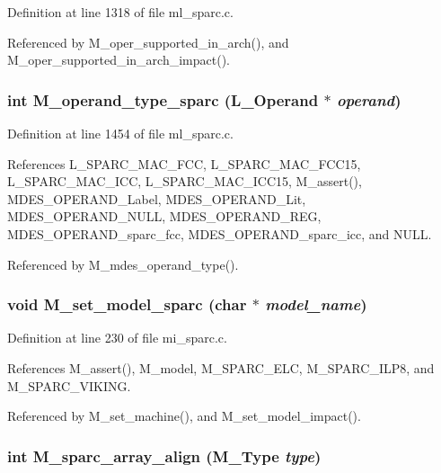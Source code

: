 Definition at line 1318 of file ml\_\-sparc.c.

Referenced by M\_\-oper\_\-supported\_\-in\_\-arch(), and M\_\-oper\_\-supported\_\-in\_\-arch\_\-impact().
\subsubsection{\setlength{\rightskip}{0pt plus 5cm}int M\_\-operand\_\-type\_\-sparc (L\_\-Operand $\ast$ {\em operand})}\label{m__sparc_8h_55e4c4b4c94f930666fa641ef1e9ef2d}




Definition at line 1454 of file ml\_\-sparc.c.

References L\_\-SPARC\_\-MAC\_\-FCC, L\_\-SPARC\_\-MAC\_\-FCC15, L\_\-SPARC\_\-MAC\_\-ICC, L\_\-SPARC\_\-MAC\_\-ICC15, M\_\-assert(), MDES\_\-OPERAND\_\-Label, MDES\_\-OPERAND\_\-Lit, MDES\_\-OPERAND\_\-NULL, MDES\_\-OPERAND\_\-REG, MDES\_\-OPERAND\_\-sparc\_\-fcc, MDES\_\-OPERAND\_\-sparc\_\-icc, and NULL.

Referenced by M\_\-mdes\_\-operand\_\-type().
\subsubsection{\setlength{\rightskip}{0pt plus 5cm}void M\_\-set\_\-model\_\-sparc (char $\ast$ {\em model\_\-name})}\label{m__sparc_8h_d5fc449ca458c27e4dd6cf9bda42baae}




Definition at line 230 of file mi\_\-sparc.c.

References M\_\-assert(), M\_\-model, M\_\-SPARC\_\-ELC, M\_\-SPARC\_\-ILP8, and M\_\-SPARC\_\-VIKING.

Referenced by M\_\-set\_\-machine(), and M\_\-set\_\-model\_\-impact().
\subsubsection{\setlength{\rightskip}{0pt plus 5cm}int M\_\-sparc\_\-array\_\-align (\bf{M\_\-Type} {\em type})}\label{m__sparc_8h_70216b50d2fd5308c7ee8c8aed9d092f}




